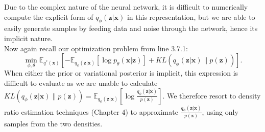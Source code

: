 \documentclass[honours,12pt]{unswthesis}
\newcommand{\E}{\mathbb{E}}
\numberwithin{equation}{section}
\theoremstyle{definition}
\begin{document}
Due to the complex nature of the neural network, it is difficult to numerically compute the explicit form of $q_\phi(\bm{z}|\bm{x})$ in this representation, but we are able to easily generate samples by feeding data and noise through the network, hence its implicit nature.\\
Now again recall our optimization problem from line 3.7.1:
\[\min_{\phi,\theta} \mathbb{E}_{q^*(\bm{x})}\left[-\E_{q_\phi(\bm{z}|\bm{x})}[\log p_\theta(\bm{x}|\bm{z})]+KL(q_\phi(\bm{z}|\bm{x})\|p(\bm{z}))\right].\]
When either the prior or variational posterior is implicit, this expression is difficult to evaluate as we are unable to calculate $KL(q_\phi(\bm{z}|\bm{x})\|p(\bm{z}))=\E_{q_\phi(\bm{z}|\bm{x})}\left[\log \frac{q_\phi(\bm{z}|\bm{x})}{p(\bm{z})}\right]$. We therefore resort to density ratio estimation techniques (Chapter 4) to approximate $\frac{q_\phi(\bm{z}|\bm{x})}{p(\bm{z})}$, using only samples from the two densities.
\end{document}
